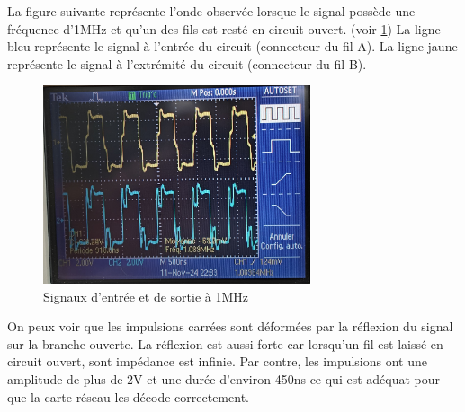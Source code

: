 La figure suivante représente l'onde observée lorsque le signal possède une fréquence d'1MHz et qu'un des fils est resté en circuit ouvert. (voir \ref{fig:Signal à 1MHz}) La
ligne bleu représente le signal à l'entrée du circuit (connecteur du fil A). La ligne jaune représente le signal à l'extrémité du circuit
(connecteur du fil B).

\begin{figure}[H]
    \centering
    \includegraphics[width=0.7\textwidth]{images/1mhz.jpg}
    \caption{Signaux d'entrée et de sortie à 1MHz}
    \label{fig:Signal à 1MHz}
\end{figure}

On peux voir que les impulsions carrées sont déformées par la réflexion du signal sur la branche ouverte. La réflexion est aussi forte car lorsqu'un fil est laissé en circuit ouvert, sont impédance est infinie. Par contre, les impulsions ont une amplitude de plus de 2V et une durée d'environ 450ns ce qui est adéquat pour que la carte réseau les décode correctement.
